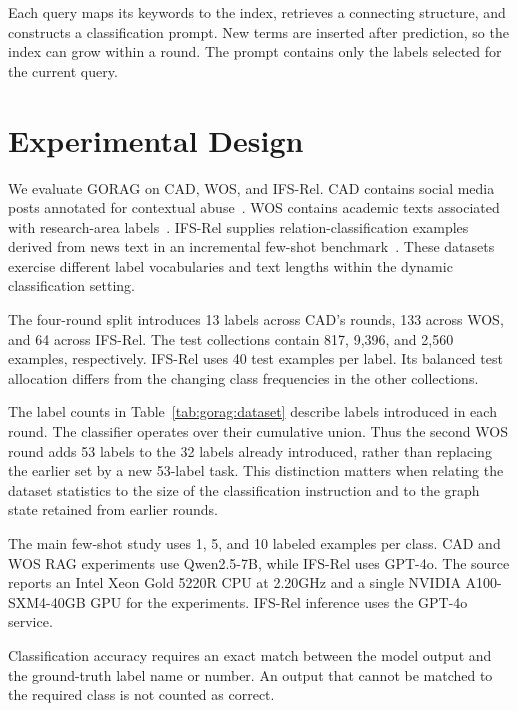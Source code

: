 Each query maps its keywords to the index, retrieves a connecting structure, and constructs a classification prompt. New terms are inserted after prediction, so the index can grow within a round. The prompt contains only the labels selected for the current query.

\section{Experimental Design}
\label{sec:gorag:experiments}

We evaluate GORAG on CAD, WOS, and IFS-Rel. CAD contains social media posts annotated for contextual abuse~\cite{gorag-vidgen2021introducing}. WOS contains academic texts associated with research-area labels~\cite{gorag-kowsari2017hdltex}. IFS-Rel supplies relation-classification examples derived from news text in an incremental few-shot benchmark~\cite{gorag-xia-etal-2021-incremental}. These datasets exercise different label vocabularies and text lengths within the dynamic classification setting.

The four-round split introduces 13 labels across CAD's rounds, 133 across WOS, and 64 across IFS-Rel. The test collections contain 817, 9,396, and 2,560 examples, respectively. IFS-Rel uses 40 test examples per label. Its balanced test allocation differs from the changing class frequencies in the other collections.



The label counts in Table~\ref{tab:gorag:dataset} describe labels introduced in each round. The classifier operates over their cumulative union. Thus the second WOS round adds 53 labels to the 32 labels already introduced, rather than replacing the earlier set by a new 53-label task. This distinction matters when relating the dataset statistics to the size of the classification instruction and to the graph state retained from earlier rounds.

The main few-shot study uses 1, 5, and 10 labeled examples per class. CAD and WOS RAG experiments use Qwen2.5-7B, while IFS-Rel uses GPT-4o. The source reports an Intel Xeon Gold 5220R CPU at 2.20GHz and a single NVIDIA A100-SXM4-40GB GPU for the experiments. IFS-Rel inference uses the GPT-4o service.

Classification accuracy requires an exact match between the model output and the ground-truth label name or number. An output that cannot be matched to the required class is not counted as correct.

